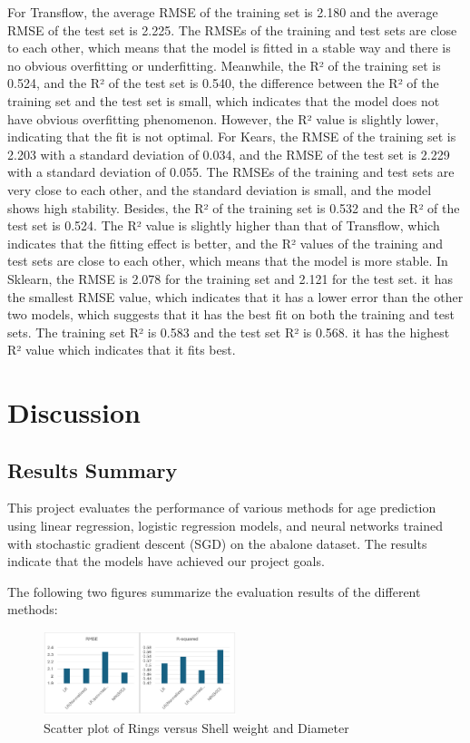 \documentclass[conference]{IEEEtran}
\begin{document}
For Transflow, the average RMSE of the training set is 2.180 and the average RMSE of the test set is 2.225. The RMSEs of the training and test sets are close to each other, which means that the model is fitted in a stable way and there is no obvious overfitting or underfitting. Meanwhile, the R² of the training set is 0.524, and the R² of the test set is 0.540, the difference between the R² of the training set and the test set is small, which indicates that the model does not have obvious overfitting phenomenon. However, the R² value is slightly lower, indicating that the fit is not optimal.
For Kears, the RMSE of the training set is 2.203 with a standard deviation of 0.034, and the RMSE of the test set is 2.229 with a standard deviation of 0.055. The RMSEs of the training and test sets are very close to each other, and the standard deviation is small, and the model shows high stability. Besides, the R² of the training set is 0.532 and the R² of the test set is 0.524. The R² value is slightly higher than that of Transflow, which indicates that the fitting effect is better, and the R² values of the training and test sets are close to each other, which means that the model is more stable.
In Sklearn, the RMSE is 2.078 for the training set and 2.121 for the test set. it has the smallest RMSE value, which indicates that it has a lower error than the other two models, which suggests that it has the best fit on both the training and test sets. The training set R² is 0.583 and the test set R² is 0.568. it has the highest R² value which indicates that it fits best.

\section{Discussion}
\subsection{Results Summary }

This project evaluates the performance of various methods for age prediction using linear regression, logistic regression models, and neural networks trained with stochastic gradient descent (SGD) on the abalone dataset. The results indicate that the models have achieved our project goals.

The following two figures summarize the evaluation results of the different methods:

\begin{figure}[H]
    \centering
    \includegraphics[width=0.5\textwidth]{model_comp1.png} %
    \caption{Scatter plot of Rings versus Shell weight and Diameter}
    \label{fig:example2_image}
\end{figure}
\end{document}
